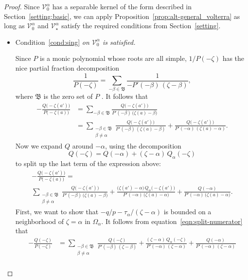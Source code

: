\documentclass{article}
\theoremstyle{definition}
\theoremstyle{plain}
\newcommand{\hardpart}{\mathcal{V}_0}
\newcommand{\softpart}{\mathcal{V}_\star}
\newcommand{\roots}{\mathfrak{B}}
\newcommand{\domain}{\Omega}
\begin{document}
\begin{proof}
Since $\hardpart^\alpha$ has a separable kernel of the form described in Section~\ref{setting:basic}, we can apply Proposition~\ref{prop:alt-general_volterra} as long as $\hardpart^\alpha$ and $\softpart^\alpha$ satisfy the required conditions from Section~\ref{setting}.
\begin{itemize}
\item Condition~\eqref{cond:sing} {\em on $\hardpart^\alpha$ is satisfied.}

Since $P$ is a monic polynomial whose roots are all simple, $1/P(-\zeta)$ has the nice partial fraction decomposition
\[ \frac{1}{P(-\zeta)} = \sum_{-\beta \in \roots} \frac{1}{-P'(-\beta)\,(\zeta - \beta)}, \]
where $\roots$ is the zero set of $P$ \cite[Section 1.4, Exercise~2]{ahlfors}. 
It follows that
\begin{align*}
-\frac{Q\big(-\zeta(a')\big)}{P\big(-\zeta(a)\big)} & = \sum_{-\beta \in \roots} \frac{Q\big(-\zeta(a')\big)}{P'(-\beta)\,\big(\zeta(a) - \beta\big)} \\
& = \sum_{\substack{-\beta \in \roots \\ \beta \neq \alpha}} \frac{Q\big(-\zeta(a')\big)}{P'(-\beta)\,(\zeta(a) - \beta)} + \frac{Q\big(-\zeta(a')\big)}{P'(-\alpha)\,(\zeta(a) - \alpha)}.
\end{align*}
Now we expand $Q$ around $-\alpha$, using the decomposition
\[ Q(-\zeta) = Q(-\alpha)+(\zeta-\alpha)\,Q_\alpha(-\zeta) \]
to split up the last term of the expression above:
\begin{multline}\label{eqn:split-numerator}
-\frac{Q\big(-\zeta(a')\big)}{P\big(-\zeta(a)\big)} = \\
\sum_{\substack{-\beta \in \roots \\ \beta \neq \alpha}} \frac{Q\big(-\zeta(a')\big)}{P'(-\beta)\,\big(\zeta(a) - \beta\big)} + \frac{\big(\zeta(a') - \alpha\big)\,Q_\alpha\big(-\zeta(a')\big)}{P'(-\alpha)\,\big(\zeta(a) - \alpha\big)} + \frac{Q(-\alpha)}{P'(-\alpha)\,\big(\zeta(a) - \alpha\big)}.    
\end{multline}
First, we want to show that $-q/p-\tau_\alpha/(\zeta-\alpha)$ is bounded on a neighborhood of $\zeta = \alpha$ in $\domain_\alpha$. It follows from equation~\eqref{eqn:split-numerator} that
\begin{align*}
-\frac{Q(-\zeta)}{P(-\zeta)} & =
\sum_{\substack{-\beta \in \roots \\ \beta \neq \alpha}} \frac{Q(-\zeta)}{P'(-\beta)\,(\zeta - \beta)} + \frac{(\zeta - \alpha)\,Q_\alpha(-\zeta)}{P'(-\alpha)\,(\zeta - \alpha)} + \frac{Q(-\alpha)}{P'(-\alpha)\,(\zeta - \alpha)} \\

\end{align*}
\end{itemize}
\end{proof}
\end{document}
